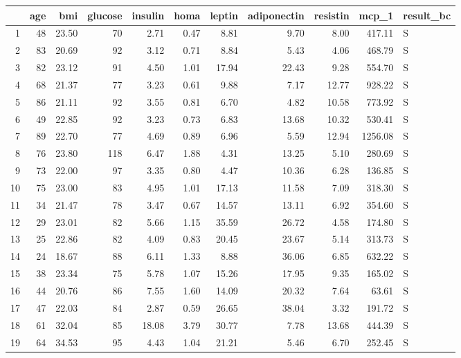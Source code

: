 \begin{table}[ht]
\centering
\begin{tabular}{rrrrrrrrrrl}
  \hline
 & age & bmi & glucose & insulin & homa & leptin & adiponectin & resistin & mcp\_1 & result\_bc \\ 
  \hline
1 &  48 & 23.50 &  70 & 2.71 & 0.47 & 8.81 & 9.70 & 8.00 & 417.11 & S \\ 
  2 &  83 & 20.69 &  92 & 3.12 & 0.71 & 8.84 & 5.43 & 4.06 & 468.79 & S \\ 
  3 &  82 & 23.12 &  91 & 4.50 & 1.01 & 17.94 & 22.43 & 9.28 & 554.70 & S \\ 
  4 &  68 & 21.37 &  77 & 3.23 & 0.61 & 9.88 & 7.17 & 12.77 & 928.22 & S \\ 
  5 &  86 & 21.11 &  92 & 3.55 & 0.81 & 6.70 & 4.82 & 10.58 & 773.92 & S \\ 
  6 &  49 & 22.85 &  92 & 3.23 & 0.73 & 6.83 & 13.68 & 10.32 & 530.41 & S \\ 
  7 &  89 & 22.70 &  77 & 4.69 & 0.89 & 6.96 & 5.59 & 12.94 & 1256.08 & S \\ 
  8 &  76 & 23.80 & 118 & 6.47 & 1.88 & 4.31 & 13.25 & 5.10 & 280.69 & S \\ 
  9 &  73 & 22.00 &  97 & 3.35 & 0.80 & 4.47 & 10.36 & 6.28 & 136.85 & S \\ 
  10 &  75 & 23.00 &  83 & 4.95 & 1.01 & 17.13 & 11.58 & 7.09 & 318.30 & S \\ 
  11 &  34 & 21.47 &  78 & 3.47 & 0.67 & 14.57 & 13.11 & 6.92 & 354.60 & S \\ 
  12 &  29 & 23.01 &  82 & 5.66 & 1.15 & 35.59 & 26.72 & 4.58 & 174.80 & S \\ 
  13 &  25 & 22.86 &  82 & 4.09 & 0.83 & 20.45 & 23.67 & 5.14 & 313.73 & S \\ 
  14 &  24 & 18.67 &  88 & 6.11 & 1.33 & 8.88 & 36.06 & 6.85 & 632.22 & S \\ 
  15 &  38 & 23.34 &  75 & 5.78 & 1.07 & 15.26 & 17.95 & 9.35 & 165.02 & S \\ 
  16 &  44 & 20.76 &  86 & 7.55 & 1.60 & 14.09 & 20.32 & 7.64 & 63.61 & S \\ 
  17 &  47 & 22.03 &  84 & 2.87 & 0.59 & 26.65 & 38.04 & 3.32 & 191.72 & S \\ 
  18 &  61 & 32.04 &  85 & 18.08 & 3.79 & 30.77 & 7.78 & 13.68 & 444.39 & S \\ 
  19 &  64 & 34.53 &  95 & 4.43 & 1.04 & 21.21 & 5.46 & 6.70 & 252.45 & S \\ 

\end{tabular}
\end{table}
